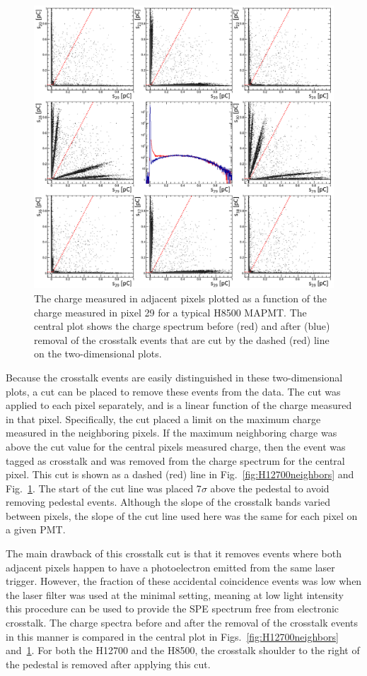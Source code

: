 \begin{figure}[h!bt]
    \centering
	\includegraphics[width=0.9\linewidth]{figures/H8500_ct_updated.png}
	\caption{The charge measured in adjacent pixels plotted as a function of the charge measured in pixel 29 for a typical H8500 MAPMT. The central plot shows the charge spectrum before (red) and after (blue) removal of the crosstalk events that are cut by the dashed (red) line on the two-dimensional plots.}
	\label{fig:H8500neighbors}
\end{figure}

Because the crosstalk events are easily distinguished in these two-dimensional plots, a cut can be placed to remove these events from the data. The cut was applied to each pixel separately, and is a linear function of the charge measured in that pixel. Specifically, the cut placed a limit on the maximum charge measured in the neighboring pixels. If the maximum neighboring charge was above the cut value for the central pixel\textquotesingle s measured charge, then the event was tagged as crosstalk and was removed from the charge spectrum for the central pixel. This cut is shown as a dashed (red) line in Fig.~\ref{fig:H12700neighbors} and Fig.~\ref{fig:H8500neighbors}. The start of the cut line was placed 7$\sigma$ above the pedestal to avoid removing pedestal events. Although the slope of the crosstalk bands varied between pixels, the slope of the cut line used here was the same for each pixel on a given PMT. 

The main drawback of this crosstalk cut is that it removes events where both adjacent pixels  happen to have a photoelectron emitted from the same laser trigger. However, the fraction of these accidental coincidence events was low when the laser filter was used at the minimal setting, meaning at low light intensity this procedure can be used to provide the SPE spectrum free from electronic crosstalk. The charge spectra before and after the removal of the crosstalk events in this manner is compared in the central plot in Figs.~\ref{fig:H12700neighbors} and~\ref{fig:H8500neighbors}. For both the H12700 and the H8500, the crosstalk shoulder to the right of the pedestal is removed after applying this cut. 
